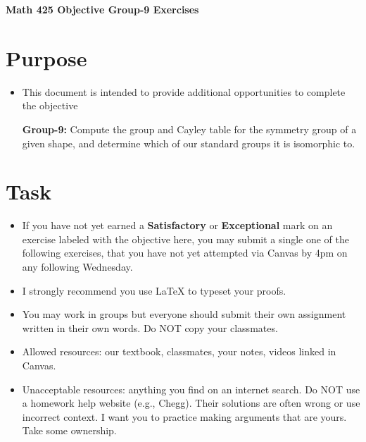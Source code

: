 \documentclass[12pt]{article}
\begin{document}
	\begin{center}
		{\Large \bf Math 425 Objective Group-9 Exercises}
	\end{center}
	\section*{Purpose}
	\begin{itemize}
		\item This document is intended to provide additional opportunities to complete the objective
		
		\textbf{Group-9:}  Compute the group and Cayley table for the symmetry group of a given shape, and determine which of our standard groups it is isomorphic to.
	\end{itemize}
	\section*{Task}
	\begin{itemize}
		\item If you have not yet earned a \textbf{Satisfactory} or \textbf{Exceptional} mark on an exercise labeled with the objective here, you may submit a single one of the following exercises, that you have not yet attempted via Canvas by 4pm on any following Wednesday.
		\item I strongly recommend you use LaTeX to typeset your proofs.
		\item You may work in groups but everyone should submit their own assignment written in their own words.  Do NOT copy your classmates.
		\item Allowed resources: our textbook, classmates, your notes, videos linked in Canvas.
		\item Unacceptable resources: anything you find on an internet search. Do NOT use a homework help website (e.g., Chegg). Their solutions are often wrong or use incorrect context.  I want you to practice making arguments that are yours. Take some ownership.
	\end{itemize}
\end{document}
